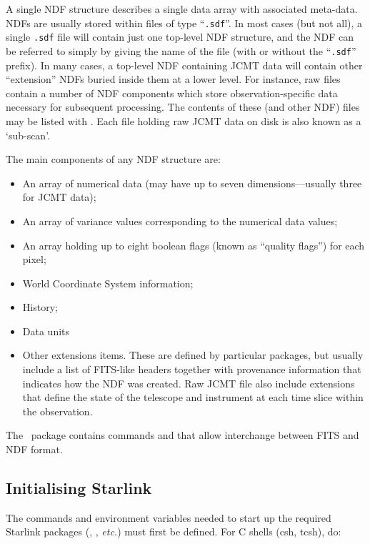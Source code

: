 A single NDF structure describes a single data array with associated
meta-data. NDFs are usually stored within files of type ``\verb+.sdf+''.
In most cases (but not all), a single \verb+.sdf+ file will contain just
one top-level NDF structure, and the NDF can be referred to simply by
giving the name of the file (with or without the ``\verb+.sdf+'' prefix).
In many cases, a top-level NDF containing JCMT data will contain other
``extension'' NDFs buried inside them at a lower level. For instance, raw
files contain a number of NDF components which store observation-specific
data necessary for subsequent processing. The contents of these (and
other NDF) files may be listed with \HDSTRACEref. Each file holding raw
JCMT data on disk is also known as a `sub-scan'.

The main components of any NDF structure are:
\begin{itemize}
\item An array of numerical data (may have up to seven
dimensions---usually three for JCMT data);
\item An array of variance values corresponding to the numerical data
values;
\item An array holding up to eight boolean flags (known as ``quality
flags'') for each pixel;
\item World Coordinate System information;
\item History;
\item Data units
\item Other extensions items. These are defined by particular packages,
but usually include a list of FITS-like headers together with provenance
information that indicates how the NDF was created. Raw JCMT file also
include extensions that define the state of the telescope and instrument
at each time slice within the observation.
\end{itemize}

The \convert\ package contains commands  and
 that allow interchange between FITS
and NDF format.

\subsection{Initialising Starlink}
\label{sec:starinit}

The commands and environment variables needed to start up the required
Starlink packages (\smurf \cite{smurf}, \Kappa, \emph{etc.}) must first
be defined. For C shells (csh, tcsh), do:

